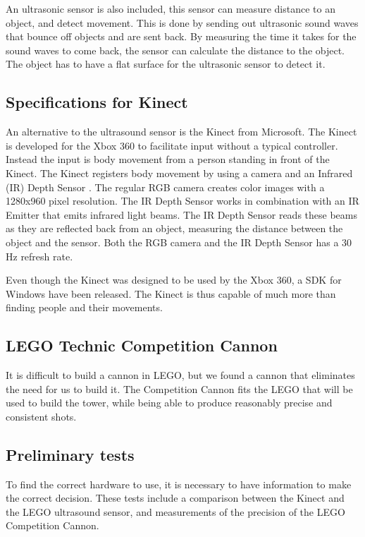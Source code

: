 An ultrasonic sensor is also included, this sensor can measure distance to an object, and detect movement. This is done by sending out ultrasonic sound waves that bounce off objects and are sent back. By measuring the time it takes for the sound waves to come back, the sensor can calculate the distance to the object. The object has to have a flat surface for the ultrasonic sensor to detect it.

\subsection{Specifications for Kinect}
An alternative to the ultrasound sensor is the Kinect from Microsoft. The Kinect is developed for the Xbox 360 to facilitate input without a typical controller. Instead the input is body movement from a person standing in front of the Kinect. The Kinect registers body movement by using a camera and an Infrared (IR) Depth Sensor \cite{kinectspec}. The regular RGB camera creates color images with a 1280x960 pixel resolution. The IR Depth Sensor works in combination with an IR Emitter that emits infrared light beams. The IR Depth Sensor reads these beams as they are reflected back from an object, measuring the distance between the object and the sensor. Both the RGB camera and the IR Depth Sensor has a 30 Hz refresh rate.

Even though the Kinect was designed to be used by the Xbox 360, a SDK for Windows have been released. The Kinect is thus capable of much more than finding people and their movements.

\subsection{LEGO Technic Competition Cannon}
It is difficult to build a cannon in LEGO, but we found a cannon that eliminates the need for us to build it. The Competition Cannon fits the LEGO that will be used to build the tower, while being able to produce reasonably precise and consistent shots.

\subsection{Preliminary tests}
To find the correct hardware to use, it is necessary to have information to make the correct decision. These tests include a comparison between the Kinect and the LEGO ultrasound sensor, and measurements of the precision of the LEGO Competition Cannon.


